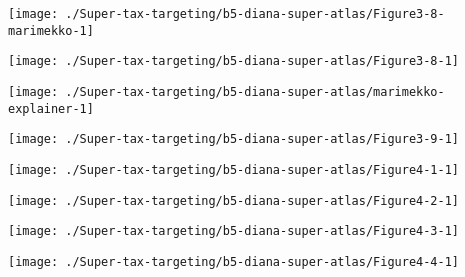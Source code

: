 \documentclass[tikz]{standalone}\usepackage[]{graphicx}\usepackage[]{color}
\newenvironment{knitrout}{}{} %
\begin{document}
\begin{knitrout}
\color{fgcolor}
\texttt{[image: ./Super-tax-targeting/b5-diana-super-atlas/Figure3-8-marimekko-1]} 

\end{knitrout}

\begin{knitrout}
\color{fgcolor}
\texttt{[image: ./Super-tax-targeting/b5-diana-super-atlas/Figure3-8-1]} 

\end{knitrout}

\begin{knitrout}
\color{fgcolor}
\texttt{[image: ./Super-tax-targeting/b5-diana-super-atlas/marimekko-explainer-1]} 

\end{knitrout}

\begin{knitrout}
\color{fgcolor}
\texttt{[image: ./Super-tax-targeting/b5-diana-super-atlas/Figure3-9-1]} 

\end{knitrout}

\begin{knitrout}
\color{fgcolor}
\texttt{[image: ./Super-tax-targeting/b5-diana-super-atlas/Figure4-1-1]} 

\end{knitrout}

\begin{knitrout}
\color{fgcolor}
\texttt{[image: ./Super-tax-targeting/b5-diana-super-atlas/Figure4-2-1]} 

\end{knitrout}

\begin{knitrout}
\color{fgcolor}
\texttt{[image: ./Super-tax-targeting/b5-diana-super-atlas/Figure4-3-1]} 

\end{knitrout}

\begin{knitrout}
\color{fgcolor}
\texttt{[image: ./Super-tax-targeting/b5-diana-super-atlas/Figure4-4-1]} 

\end{knitrout}
\end{document}
